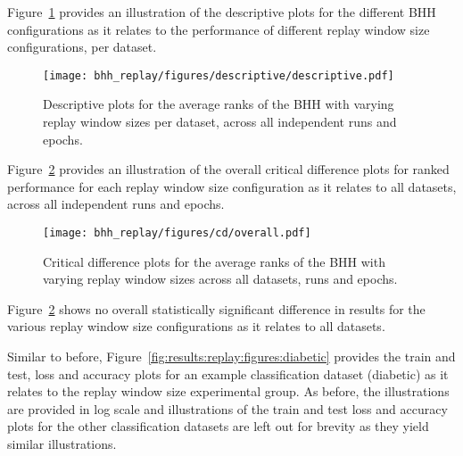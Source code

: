 Figure~\ref{fig:results:replay:descriptive:descriptive} provides an illustration of the descriptive plots for the different \acs{BHH} configurations as it relates to the performance of different replay window size configurations, per dataset.

\begin{figure}[htb]
	\centering
	\texttt{[image: bhh\_replay/figures/descriptive/descriptive.pdf]}
	\caption{Descriptive plots for the average ranks of the \acs{BHH} with varying replay window sizes per dataset, across all independent runs and epochs.}
	\label{fig:results:replay:descriptive:descriptive}
\end{figure}

Figure~\ref{fig:results:replay:descriptive:cd} provides an illustration of the overall critical difference plots for ranked performance for each replay window size configuration as it relates to all datasets, across all independent runs and epochs.

\begin{figure}[htb]
	\centering
	\texttt{[image: bhh\_replay/figures/cd/overall.pdf]}
	\caption{Critical difference plots for the average ranks of the \acs{BHH} with varying replay window sizes across all datasets, runs and epochs.}
	\label{fig:results:replay:descriptive:cd}
\end{figure}

Figure~\ref{fig:results:replay:descriptive:cd} shows no overall statistically significant difference in results for the various replay window size configurations as it relates to all datasets.

Similar to before, Figure~\ref{fig:results:replay:figures:diabetic} provides the train and test, loss and accuracy plots for an example classification dataset (diabetic) as it relates to the replay window size experimental group. As before, the illustrations are provided in log scale and illustrations of the train and test loss and accuracy plots for the other classification datasets are left out for brevity as they yield similar illustrations.

